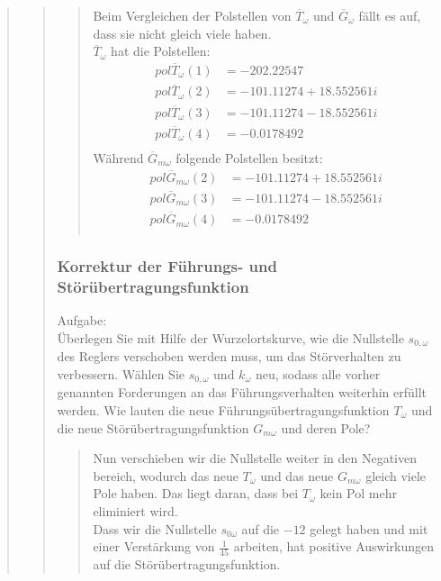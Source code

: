 \begin{quote}
\begin{quote}
\begin{quote}
            Beim Vergleichen der Polstellen von $\overline{T}_\omega$ und $\overline{G}_\omega$ fällt es auf, dass sie
            nicht gleich viele haben.\\
            $\overline{T}_\omega$ hat die Polstellen:\\
            \begin{equation*}
            	\begin{split}
            		pol \overline{T}_\omega (1) &= - 202.22547\\
                    pol \overline{T}_\omega (2) &= - 101.11274 + 18.552561i\\
                    pol \overline{T}_\omega (3) &= - 101.11274 - 18.552561i\\            		
                    pol \overline{T}_\omega (4) &= - 0.0178492\\
            	\end{split}
            \end{equation*}
            Während $\overline{G}_{m\omega}$ folgende Polstellen besitzt:
            \begin{equation*}
            	\begin{split}
                    pol \overline{G}_{m\omega} (2) &= - 101.11274 + 18.552561i\\
                    pol \overline{G}_{m\omega} (3) &= - 101.11274 - 18.552561i\\                   
                    pol \overline{G}_{m\omega} (4) &= - 0.0178492\\            		
            	\end{split}
            \end{equation*}
                        
		\end{quote}
		
		\subsubsection{Korrektur der Führungs- und Störübertragungsfunktion}
		\label{2f}
		Aufgabe:\\
	    Überlegen Sie mit Hilfe der Wurzelortskurve, wie die Nullstelle $s_{0,\omega}$ des Reglers verschoben werden muss, um
	    das Störverhalten zu verbessern. Wählen Sie $s_{0,\omega}$ und $k_\omega$ neu, sodass alle vorher genannten
	    Forderungen an das Führungsverhalten weiterhin erfüllt werden. Wie lauten die neue
	    Führungsübertragungsfunktion $T_\omega$ und die neue Störübertragungsfunktion $G_{m\omega}$ und deren Pole?
		\begin{quote}
		\vspace{1em}
			Nun verschieben wir die Nullstelle weiter in den Negativen bereich, wodurch das neue $T_\omega$ und das
			neue $G_{m\omega}$ gleich viele Pole haben. Das liegt daran, dass bei $T_\omega$ kein Pol mehr eliminiert wird.\\
			Dass wir die Nullstelle $s_{0\omega}$ auf die $-12$ gelegt haben und mit einer Verstärkung von $\frac{1}{45}$
			arbeiten, hat positive Auswirkungen auf die Störübertragungsfunktion.
			

\end{quote}
\end{quote}
\end{quote}
